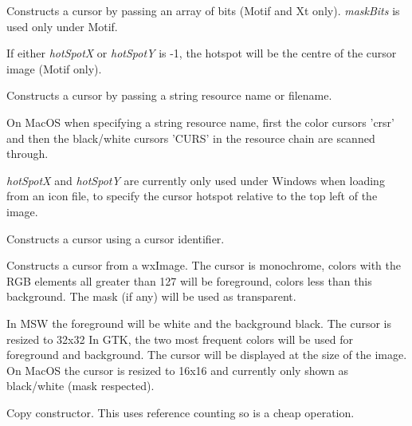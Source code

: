 Constructs a cursor by passing an array of bits (Motif and Xt only). {\it maskBits} is used only under Motif.

If either {\it hotSpotX} or {\it hotSpotY} is -1, the hotspot will be the centre of the cursor image (Motif only).


Constructs a cursor by passing a string resource name or filename.

On MacOS when specifying a string resource name, first the color cursors 'crsr' and then the black/white cursors 'CURS' in the resource chain are scanned through.

{\it hotSpotX} and {\it hotSpotY} are currently only used under Windows when loading from an
icon file, to specify the cursor hotspot relative to the top left of the image.


Constructs a cursor using a cursor identifier.


Constructs a cursor from a wxImage. The cursor is monochrome, colors with the RGB elements all greater
than 127 will be foreground, colors less than this background. The mask (if any) will be used as transparent.

In MSW the foreground will be white and the background black. The cursor is resized to 32x32
In GTK, the two most frequent colors will be used for foreground and background. The cursor will be displayed
at the size of the image.
On MacOS the cursor is resized to 16x16 and currently only shown as black/white (mask respected).


Copy constructor. This uses reference counting so is a cheap operation.








